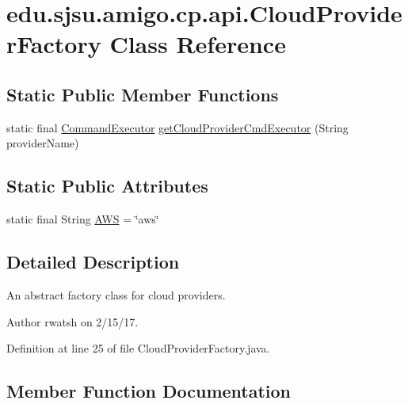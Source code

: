 \hypertarget{classedu_1_1sjsu_1_1amigo_1_1cp_1_1api_1_1_cloud_provider_factory}{}\section{edu.\+sjsu.\+amigo.\+cp.\+api.\+Cloud\+Provider\+Factory Class Reference}
\label{classedu_1_1sjsu_1_1amigo_1_1cp_1_1api_1_1_cloud_provider_factory}
\subsection*{Static Public Member Functions}
\begin{DoxyCompactItemize}
\item 
static final \hyperlink{interfaceedu_1_1sjsu_1_1amigo_1_1cp_1_1api_1_1_command_executor}{Command\+Executor} \hyperlink{classedu_1_1sjsu_1_1amigo_1_1cp_1_1api_1_1_cloud_provider_factory_ab00e72894e1bafd2bc80bf6c204765b9}{get\+Cloud\+Provider\+Cmd\+Executor} (String provider\+Name)
\end{DoxyCompactItemize}
\subsection*{Static Public Attributes}
\begin{DoxyCompactItemize}
\item 
static final String \hyperlink{classedu_1_1sjsu_1_1amigo_1_1cp_1_1api_1_1_cloud_provider_factory_a6204ce8b947a782003efaeeb40ac68f1}{A\+WS} = \char`\"{}aws\char`\"{}
\end{DoxyCompactItemize}


\subsection{Detailed Description}
An abstract factory class for cloud providers.

\begin{DoxyAuthor}{Author}
rwatsh on 2/15/17. 
\end{DoxyAuthor}


Definition at line 25 of file Cloud\+Provider\+Factory.\+java.



\subsection{Member Function Documentation}
\mbox{\label{classedu_1_1sjsu_1_1amigo_1_1cp_1_1api_1_1_cloud_provider_factory_ab00e72894e1bafd2bc80bf6c204765b9}} 

